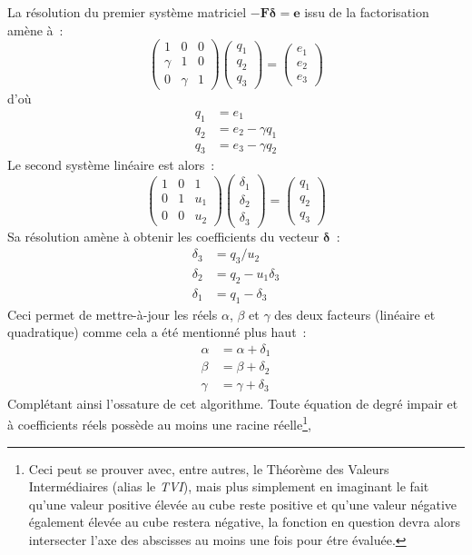 \documentclass[11pt]{amsart}
\newcommand{\mb}[1]{\mathbf{#1}}
\newcommand{\vb}[1]{\mathbf{#1}}
\begin{document}
La r\'esolution du premier syst\`eme matriciel $-\mb{F}\mathbf{\delta} = \vb{e}$ issu de la factorisation am\`ene \`a~:
$$\begin{pmatrix} 1 & 0 & 0 \\ \gamma & 1 & 0  \\ 0 & \gamma & 1 \end{pmatrix}\begin{pmatrix} q_1 \\ q_2 \\ q_3 \end{pmatrix}=\begin{pmatrix} e_1 \\ e_2 \\ e_3 \end{pmatrix}$$
d'o\`u
\[
\begin{split}
	q_1 &= e_1 \\
	q_2 &= e_2 - \gamma{}q_1 \\
	q_3 &= e_3 - \gamma{}q_2
\end{split}
\]
Le second syst\`eme lin\'eaire est alors~:
$$\begin{pmatrix} 1 & 0 & 1 \\ 0 & 1 & u_1 \\ 0 & 0 & u_2 \end{pmatrix}\begin{pmatrix} \delta_1 \\ \delta_2 \\ \delta_3 \end{pmatrix}=\begin{pmatrix} q_1 \\ q_2 \\ q_3 \end{pmatrix}$$
Sa r\'esolution am\`ene \`a obtenir les coefficients du vecteur $\vb{\delta}$~:
\[
\begin{split}
\delta_3 &= q_3 / u_2 \\
\delta_2 &= q_2 - u_1\delta_3 \\
\delta_1 &= q_1 - \delta_3
\end{split}
\]
Ceci permet de mettre-\`a-jour les r\'eels $\alpha$, $\beta$ et $\gamma$ des deux facteurs (lin\'eaire et quadratique) comme cela a \'et\'e mentionn\'e plus haut~:
\[
\begin{split}
\alpha &= \alpha + \delta_1 \\
\beta &= \beta + \delta_2 \\
\gamma &= \gamma + \delta_3
\end{split}
\]
Compl\'etant ainsi l'ossature de cet algorithme. Toute \'equation de degr\'e impair et \`a coefficients r\'eels poss\`ede au moins une racine r\'eelle\footnote{Ceci peut se prouver avec, entre autres, le Th\'eor\`eme des Valeurs Interm\'ediaires (alias le \textit{TVI}),
mais plus simplement en imaginant le fait qu'une valeur positive \'elev\'ee au cube reste positive et qu'une valeur n\'egative \'egalement \'elev\'ee au cube restera n\'egative, la fonction en question devra alors intersecter l'axe des abscisses au moins une fois pour \'etre \'evalu\'ee.},
\end{document}
